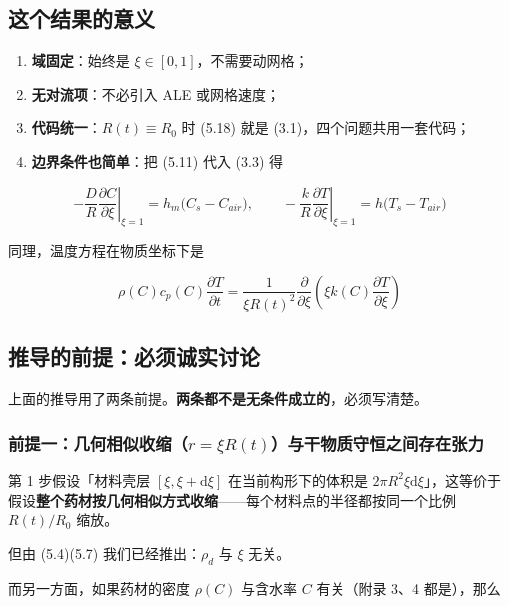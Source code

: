 \subsection{这个结果的意义}


\begin{enumerate}
\item \textbf{域固定}：始终是 $\xi\in[0,1]$，不需要动网格；
\item \textbf{无对流项}：不必引入 ALE 或网格速度；
\item \textbf{代码统一}：$R(t)\equiv R_0$ 时 (5.18) 就是 (3.1)，四个问题共用一套代码；
\item \textbf{边界条件也简单}：把 (5.11) 代入 (3.3) 得
\end{enumerate}


\begin{equation}
-\frac{D}{R}\left.\frac{\partial C}{\partial \xi}\right|_{\xi=1}=h_m\big(C_s-C_{air}\big),\qquad
-\frac{k}{R}\left.\frac{\partial T}{\partial \xi}\right|_{\xi=1}=h\big(T_s-T_{air}\big)\tag{5.19}
\end{equation}


同理，温度方程在物质坐标下是


\begin{equation}
\rho(C)c_p(C)\frac{\partial T}{\partial t}=\frac{1}{\xi R(t)^2}\frac{\partial}{\partial\xi}\left(\xi k(C)\frac{\partial T}{\partial\xi}\right)\tag{5.20}
\end{equation}


\subsection{推导的前提：必须诚实讨论}


上面的推导用了两条前提。\textbf{两条都不是无条件成立的}，必须写清楚。


\subsubsection{前提一：几何相似收缩（$r=\xi R(t)$）与干物质守恒之间存在张力}


第 1 步假设「材料壳层 $[\xi,\xi+\mathrm{d}\xi]$ 在当前构形下的体积是 $2\pi R^2\xi\mathrm{d}\xi$」，这等价于假设\textbf{整个药材按几何相似方式收缩}——每个材料点的半径都按同一个比例 $R(t)/R_0$ 缩放。


但由 (5.4)(5.7) 我们已经推出：$\rho_d$ 与 $\xi$ 无关。


而另一方面，如果药材的密度 $\rho(C)$ 与含水率 $C$ 有关（附录 3、4 都是），那么


